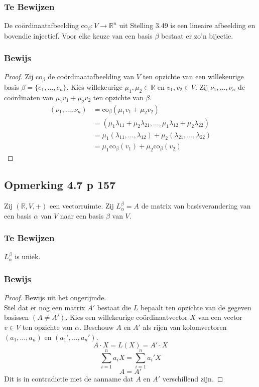 \documentclass[lineaire_algebra_oplossingen.tex]{subfiles}
\begin{document}
\subsubsection*{Te Bewijzen}
De co\"ordinaatafbeelding $\text{co}_{\beta} : V \rightarrow \mathbb{R}^n$ uit Stelling 3.49 is een lineaire afbeelding en bovendie injectief. Voor elke keuze van een basis $\beta$ bestaat er zo'n bijectie.
\subsubsection*{Bewijs}
\begin{proof}
Zij $\text{co}_{\beta}$ de co\"ordinaatafbeelding van $V$ ten opzichte van een willekeurige basis $\beta = \{e_1,\ldots,e_n\}$.
Kies willekeurige $\mu_1,\mu_2 \in \mathbb{R}$ en $v_1,v_2 \in V$. Zij $\nu_1,\ldots,\nu_n$ de co\"ordinaten van $\mu_1v_1+\mu_2v_2$ ten opzichte van $\beta$.
\begin{align*}
(\nu_1,\ldots,\nu_n)
&= \text{co}_{\beta}(\mu_1v_1+\mu_2v_2) \\
&= (\mu_1\lambda_{11}+ \mu_2\lambda_{21},\ldots,\mu_1\lambda_{12}+ \mu_2\lambda_{22}) \\
&= \mu_1(\lambda_{11},\ldots,\lambda_{12})
+ \mu_2(\lambda_{21},\ldots,\lambda_{22}) \\
&= \mu_1\text{co}_{\beta}(v_1)+\mu_2\text{co}_{\beta}(v_2)
\end{align*}
\end{proof}


\subsection{Opmerking 4.7 p 157}
\label{4.7}
Zij $(\mathbb{R},V,+)$ een vectorruimte.
Zij $L_{\alpha}^{\beta} = A$ de matrix van basisverandering van een basis $\alpha$ van $V$ naar een basis $\beta$ van $V$.

\subsubsection*{Te Bewijzen}
$L_{\alpha}^{\beta}$ is uniek.

\subsubsection*{Bewijs}
\begin{proof}
Bewijs uit het ongerijmde.\\
Stel dat er nog een matrix $A'$ bestaat die $L$ bepaalt ten opzichte van de gegeven basissen $(A\neq A')$.
Kies een willekeurige co\"ordinaatvector $X$ van een vector $v\in V$ ten opzichte van $\alpha$. Beschouw $A$ en $A'$ als rijen van kolomvectoren $(a_1,\ldots,a_n)$ en $(a_1',\ldots,a_n')$.
\[
A \cdot X = L(X) = A'\cdot X
\]
\[
\sum_{i=1}^na_iX = \sum_{i=1}^na_i'X
\]
\[
A=A'
\]
Dit is in contradictie met de aanname dat $A$ en $A'$ verschillend zijn.
\end{proof}
\end{document}

